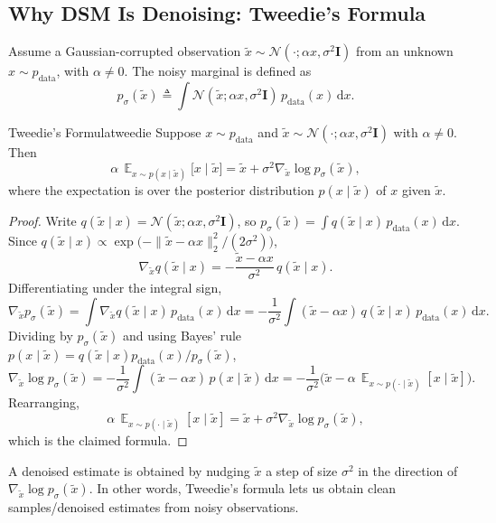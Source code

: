 \documentclass[11pt,a4paper]{article}
\newcommand{\wt}{\widetilde}
\renewcommand{\tilde}{\wt}
\renewcommand{\d}{\mathrm{d}}
\DeclareMathOperator*{\E}{\mathbb{E}}
\newcommand{\pdata}{p_{\mathrm{data}}}
\newcommand{\psigma}{p_{\sigma}}
\begin{document}
\subsection{Why DSM Is Denoising: Tweedie's Formula}\label{subsec:tweedie}

Assume a Gaussian-corrupted observation $\tilde x\sim\mathcal{N}(\cdot;\alpha x,\sigma^2\mathbf{I})$ from an unknown $x\sim\pdata$, with $\alpha\neq 0$. The noisy marginal is defined as
\[
\psigma(\tilde x)\triangleq\int \mathcal{N}(\tilde x;\alpha x,\sigma^2\mathbf{I})\,\pdata(x)\,\d x.
\]

\begin{theorem}{Tweedie's Formula}{tweedie}
Suppose $x\sim\pdata$ and $\tilde x\sim\mathcal{N}(\cdot;\alpha x,\sigma^2\mathbf{I})$ with $\alpha\neq0$. Then
\[
\alpha\,\E_{x\sim p(x\mid\tilde x)}\big[x\mid\tilde x\big]
=\tilde x+\sigma^2\nabla_{\tilde x}\log\psigma(\tilde x),
\]
where the expectation is over the posterior distribution $p(x\mid\tilde x)$ of $x$ given $\tilde x$.
\end{theorem}

\begin{proof}
Write $q(\tilde x\mid x)=\mathcal{N}(\tilde x;\alpha x,\sigma^2\mathbf{I})$, so $\psigma(\tilde x)=\int q(\tilde x\mid x)\,\pdata(x)\,\d x$. Since $q(\tilde x\mid x)\propto\exp\!\big(-\|\tilde x-\alpha x\|_2^2/(2\sigma^2)\big)$,
\[
\nabla_{\tilde x} q(\tilde x\mid x)
=-\frac{\tilde x-\alpha x}{\sigma^2}\,q(\tilde x\mid x).
\]
Differentiating under the integral sign,
\[
\nabla_{\tilde x}\psigma(\tilde x)
=\int \nabla_{\tilde x} q(\tilde x\mid x)\,\pdata(x)\,\d x
=-\frac{1}{\sigma^2}\int (\tilde x-\alpha x)\,q(\tilde x\mid x)\,\pdata(x)\,\d x.
\]
Dividing by $\psigma(\tilde x)$ and using Bayes' rule $p(x\mid\tilde x)=q(\tilde x\mid x)\pdata(x)/\psigma(\tilde x)$,
\[
\nabla_{\tilde x}\log\psigma(\tilde x)
=-\frac{1}{\sigma^2}\int (\tilde x-\alpha x)\,p(x\mid\tilde x)\,\d x
=-\frac{1}{\sigma^2}\Big(\tilde x-\alpha\,\E_{x\sim p(\cdot\mid\tilde x)}[x\mid\tilde x]\Big).
\]
Rearranging,
\[
\alpha\,\E_{x\sim p(\cdot\mid\tilde x)}[x\mid\tilde x]
=\tilde x+\sigma^2\nabla_{\tilde x}\log\psigma(\tilde x),
\]
which is the claimed formula.
\end{proof}

A denoised estimate is obtained by nudging $\tilde x$ a step of size $\sigma^2$ in the direction of $\nabla_{\tilde x}\log\psigma(\tilde x)$. In other words, Tweedie's formula lets us obtain clean samples/denoised estimates from noisy observations.
\end{document}
